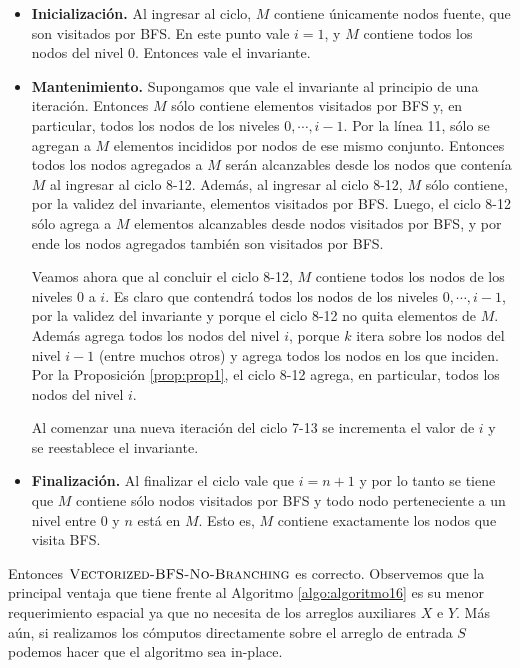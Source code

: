 \begin{itemize}
\item \textbf{Inicialización. } Al ingresar al ciclo, $M$ contiene únicamente nodos fuente, que son visitados por BFS. En este punto vale $i = 1$, y $M$ contiene todos los nodos del nivel 0. Entonces vale el invariante.

\item \textbf{Mantenimiento. } Supongamos que vale el invariante al principio de una iteración. Entonces $M$ sólo contiene elementos visitados por BFS y, en particular, todos los nodos de los niveles $0, \cdots, i - 1$. Por la línea 11, sólo se agregan a $M$ elementos incididos por nodos de ese mismo conjunto. Entonces todos los nodos agregados a $M$ serán alcanzables desde los nodos que contenía $M$ al ingresar al ciclo 8-12. Además, al ingresar al ciclo 8-12, $M$ sólo contiene, por la validez del invariante, elementos visitados por BFS. Luego, el ciclo 8-12 sólo agrega a $M$ elementos alcanzables desde nodos visitados por BFS, y por ende los nodos agregados también son visitados por BFS.

Veamos ahora que al concluir el ciclo 8-12, $M$ contiene todos los nodos de los niveles 0 a $i$. Es claro que contendrá todos los nodos de los niveles $0, \cdots, i - 1$, por la validez del invariante y porque el ciclo 8-12 no quita elementos de $M$. Además agrega todos los nodos del nivel $i$, porque $k$ itera sobre los nodos del nivel $i - 1$ (entre muchos otros) y agrega todos los nodos en los que inciden. Por la Proposición \ref{prop:prop1}, el ciclo 8-12 agrega, en particular, todos los nodos del nivel $i$.

Al comenzar una nueva iteración del ciclo 7-13 se incrementa el valor de $i$ y se reestablece el invariante. 

\item \textbf{Finalización. } Al finalizar el ciclo vale que $i = n + 1$ y por lo tanto se tiene que $M$ contiene sólo nodos visitados por BFS y todo nodo perteneciente a un nivel entre 0 y $n$ está en $M$. Esto es, $M$ contiene exactamente los nodos que visita BFS.
\end{itemize}

Entonces $\textsc{Vectorized-BFS-No-Branching}$ es correcto. Observemos que la principal ventaja que tiene frente al Algoritmo \ref{algo:algoritmo16} es su menor requerimiento espacial ya que no necesita de los arreglos auxiliares $X$ e $Y$. Más aún, si realizamos los cómputos directamente sobre el arreglo de entrada $S$ podemos hacer que el algoritmo sea in-place.

